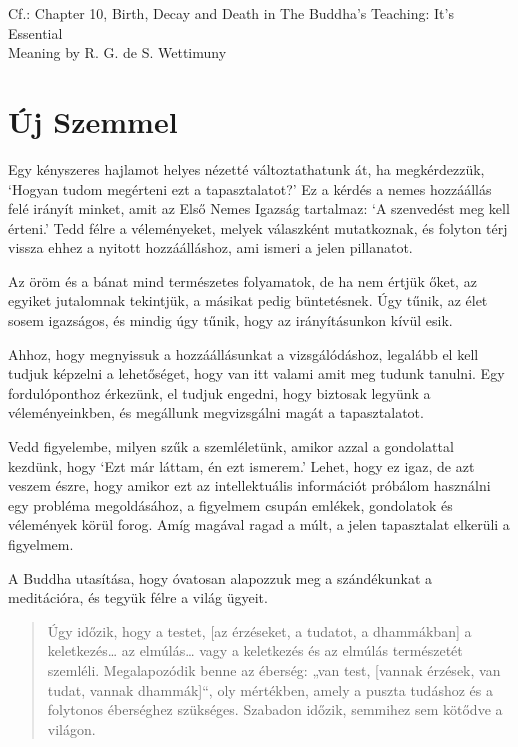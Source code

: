 {\noindent\footnotesize
Cf.: Chapter 10, Birth, Decay and Death in The Buddha's Teaching: It's Essential\\ Meaning by R. G. de S. Wettimuny
\par}


\clearpage
\normalpagelayout

\section{Új Szemmel}


\noindent Egy kényszeres hajlamot helyes nézetté változtathatunk át, ha
megkérdezzük, `Hogyan tudom megérteni ezt a tapasztalatot?' Ez a kérdés
a nemes hozzáállás felé irányít minket, amit az Első Nemes Igazság
tartalmaz: `A szenvedést meg kell érteni.' Tedd félre a véleményeket,
melyek válaszként mutatkoznak, és folyton térj vissza ehhez a nyitott
hozzáálláshoz, ami ismeri a jelen pillanatot.

Az öröm és a bánat mind természetes folyamatok, de ha nem értjük őket,
az egyiket jutalomnak tekintjük, a másikat pedig büntetésnek. Úgy tűnik,
az élet sosem igazságos, és mindig úgy tűnik, hogy az irányításunkon
kívül esik.

Ahhoz, hogy megnyissuk a hozzáállásunkat a vizsgálódáshoz, legalább el
kell tudjuk képzelni a lehetőséget, hogy van itt valami amit meg tudunk
tanulni. Egy fordulóponthoz érkezünk, el tudjuk engedni, hogy biztosak
legyünk a véleményeinkben, és megállunk megvizsgálni magát a
tapasztalatot.

Vedd figyelembe, milyen szűk a szemléletünk, amikor azzal a gondolattal
kezdünk, hogy `Ezt már láttam, én ezt ismerem.' Lehet, hogy ez igaz, de
azt veszem észre, hogy amikor ezt az intellektuális információt próbálom
használni egy probléma megoldásához, a figyelmem csupán emlékek,
gondolatok és vélemények körül forog. Amíg magával ragad a múlt, a jelen
tapasztalat elkerüli a figyelmem.

A Buddha utasítása, hogy óvatosan alapozzuk meg a szándékunkat a
meditációra, és tegyük félre a világ ügyeit.

\begin{quote}
Úgy időzik, hogy a testet, {[}az érzéseket, a tudatot, a dhammákban{]} a
keletkezés\ldots{} az elmúlás\ldots{} vagy a keletkezés és az elmúlás
természetét szemléli. Megalapozódik benne az éberség: „van test,
{[}vannak érzések, van tudat, vannak dhammák{]}``, oly mértékben, amely
a puszta tudáshoz és a folytonos éberséghez szükséges. Szabadon időzik,
semmihez sem kötődve a világon.

\bigskip

\end{quote}

